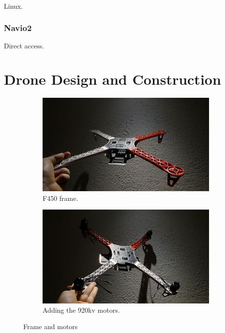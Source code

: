 Linux.

\subsubsection{Navio2}

Direct access.

\section{Drone Design and Construction}

\begin{figure}[H]
\begin{subfigure}{0.5\textwidth}
\centering
\includegraphics[scale=0.1]{images/drone-build-frame.jpg}
\caption{F450 frame.}
\label{fig:frame}
\end{subfigure}
\begin{subfigure}{0.5\textwidth}
\centering
\includegraphics[scale=0.1]{images/drone-build-motors.jpg}
\caption{Adding the 920kv motors.}
\label{fig:motors}
\end{subfigure}
\caption{Frame and motors}
\label{fig:frame_motors}
\end{figure}

